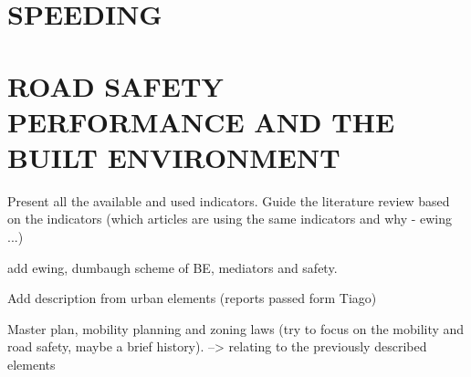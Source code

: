 \section{SPEEDING} \label{speeding}









\section{ROAD SAFETY PERFORMANCE AND THE BUILT ENVIRONMENT}






Present all the available and used indicators. Guide the literature review based on the indicators (which articles are using the same indicators and why - ewing ...)

add ewing, dumbaugh scheme of BE, mediators and safety.

Add description from urban elements (reports passed form Tiago)

Master plan, mobility planning and zoning laws (try to focus on the mobility and road safety, maybe a brief history). --> relating to the previously described elements

